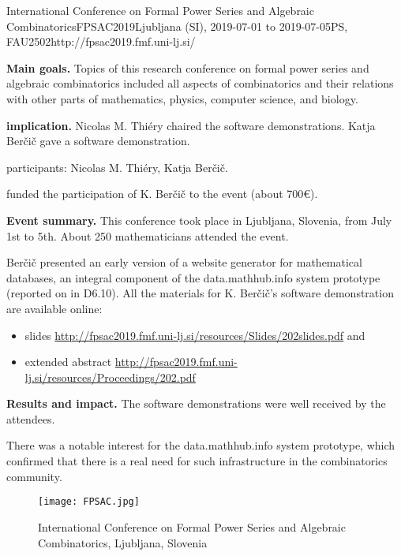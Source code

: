 \begin{event}{International Conference on Formal Power Series and Algebraic Combinatorics}{FPSAC2019}{Ljubljana (SI),
  2019-07-01 to
  2019-07-05}{PS, FAU}{250}{2}{http://fpsac2019.fmf.uni-lj.si/}
  
\textbf{Main goals.} Topics of this research conference on 
formal power series and algebraic combinatorics
included all aspects of combinatorics and their relations with 
other parts of mathematics, physics, computer science, and biology.

\textbf{\ODK implication.} Nicolas M. Thi\'ery chaired the software demonstrations.
Katja Ber\v{c}i\v{c} gave a software demonstration.

\ODK participants: Nicolas M. Thi\'ery, Katja Ber\v{c}i\v{c}.

\ODK funded the participation of K. Ber\v{c}i\v{c} to the event (about 700\euro).

\textbf{Event summary.} This conference took place in Ljubljana, Slovenia, from July 1st to 5th.
About 250 mathematicians attended the event.

Ber\v{c}i\v{c} presented an early version of a website generator for mathematical databases, 
an integral component of the \textsf{data.math\-hub.info} system prototype (reported on in D6.10).
All the materials for K. Ber\v{c}i\v{c}'s software demonstration are available online:
\begin{itemize}
\item slides \url{http://fpsac2019.fmf.uni-lj.si/resources/Slides/202slides.pdf} and
\item extended abstract \url{http://fpsac2019.fmf.uni-lj.si/resources/Proceedings/202.pdf}
\end{itemize}

\textbf{Results and impact.} The software demonstrations were well received by the attendees.

There was a notable interest for the \textsf{data.math\-hub.info} system prototype,
which confirmed that there is a real need for such infrastructure in the combinatorics community.

\begin{figure}[ht]
\texttt{[image: FPSAC.jpg]}
\caption*{International Conference on Formal Power Series and Algebraic Combinatorics, Ljubljana, Slovenia}
\end{figure}

\end{event}
